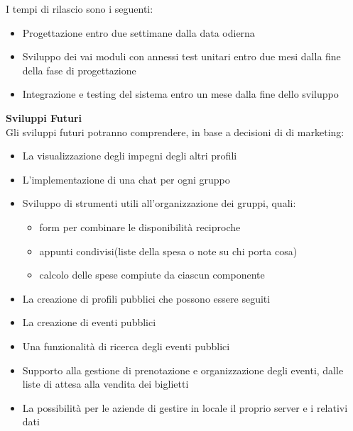 I tempi di rilascio sono i seguenti:
\begin{itemize}
    \item Progettazione entro due settimane dalla data odierna
    \item Sviluppo dei vai moduli con annessi test unitari entro due mesi dalla fine della fase di progettazione
    \item Integrazione e testing del sistema entro un mese dalla fine dello sviluppo
\end{itemize}
\hfill \break

\textbf{Sviluppi Futuri}
\\
Gli sviluppi futuri potranno comprendere, in base a decisioni di di marketing:
\begin{itemize}
    \item La visualizzazione degli impegni degli altri profili
    \item L'implementazione di una chat per ogni gruppo
    \item Sviluppo di strumenti utili all'organizzazione dei gruppi, quali:
          \begin{itemize}
              \item form per combinare le disponibilità reciproche
              \item appunti condivisi(liste della spesa o note su chi porta cosa)
              \item calcolo delle spese compiute da ciascun componente
          \end{itemize}
    \item La creazione di profili pubblici che possono essere seguiti
    \item La creazione di eventi pubblici
    \item Una funzionalità di ricerca degli eventi pubblici
    \item Supporto alla gestione di prenotazione e organizzazione degli eventi, dalle liste di attesa alla vendita dei biglietti
    \item La possibilità per le aziende di gestire in locale il proprio server e i relativi dati
\end{itemize}

